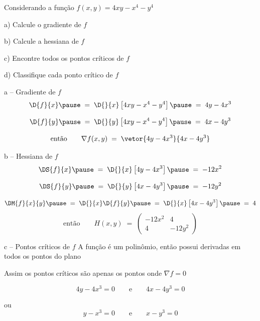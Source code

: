 \begin{question}
  Considerando a função
  \(
    f(x, y) = 4xy -x^4 -y^4
  \)

  a) Calcule o gradiente de $f$

  b) Calcule a hessiana de $f$

  c) Encontre todos os pontos críticos de $f$

  d) Classifique cada ponto crítico de $f$
\end{question}

\begin{resolution}{a -- Gradiente de $f$}
  \[
    \D{f}{x}
    \pause
    \;=\; \D{}{x}\left[4xy -x^4 -y^4\right]
    \pause
    \;=\; 4y - 4x^3
  \]

  \pause
  \[
    \D{f}{y}
    \pause
    \;=\;  \D{}{y}\left[4xy -x^4 -y^4\right]
    \pause
    \;=\;  4x -4y^3
  \]

  \pause
  \[
    \text{então}\qquad
    \nabla f(x, y) \;=\; \vetor{4y - 4x^3}{4x -4y^3}
  \]
\end{resolution}

\begin{resolution}{b -- Hessiana de $f$}
  \[
    \DS{f}{x}
    \pause
    \;=\; \D{}{x}\left[4y - 4x^3\right]
    \pause
    \;=\; -12x^2
  \]

  \pause
  \[
    \DS{f}{y}
    \pause
    \;=\; \D{}{y}\left[4x -4y^3\right]
    \pause
    \;=\; -12y^2
  \]

  \pause
  \[
    \DM{f}{x}{y}
    \pause
    \;=\; \D{}{x}\D{f}{y}
    \pause
    \;=\; \D{}{x}\left[4x -4y^3\right]
    \pause
    \;=\; 4
  \]
  \pause
  \[
    \text{então}\qquad
    H(x, y)
    \;=\; \left(\begin{array}{cc}
      -12x^2 & 4      \\
      4      & -12y^2
    \end{array}\right)
  \]
\end{resolution}

\begin{resolution}{c -- Pontos críticos de $f$}
  A função é um polinômio, então possui derivadas em todos os pontos do plano

  \pause
  Assim os pontos críticos são apenas os pontos onde \(\nabla f = 0\)

  \pause
  \[
    4y - 4x^3 = 0
    \qquad\text{e}\qquad
    4x -4y^3 = 0
  \]

  \pause
  ou
  \[
    y - x^3 = 0
    \qquad\text{e}\qquad
    x - y^3 = 0
  \]
\end{resolution}

